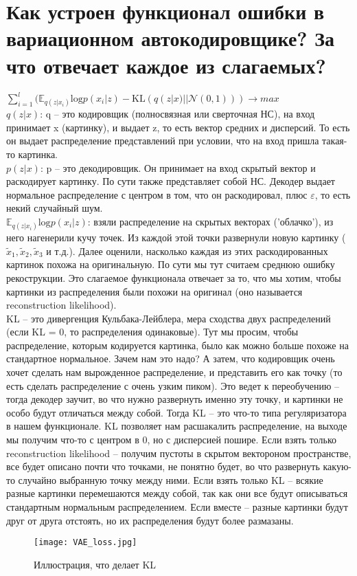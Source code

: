 \section{Как устроен функционал ошибки в вариационном автокодировщике? За что отвечает каждое из слагаемых?} %

$\sum\limits^{l}_{i = 1}(\mathbb{E}_{q(z|x_{i})}\text{log} p(x_{i} | z) - \text{KL}(q(z|x) || \mathcal{N}(0,1))) \rightarrow max$ \\ 

$q(z|x)$: q -- это кодировщик (полносвязная или сверточная НС), на вход принимает x (картинку), и выдает z, то есть вектор средних и дисперсий. То есть он выдает распределение представлений при условии, что на вход пришла такая-то картинка. \\ 

$p(z|x)$: p -- это декодировщик. Он принимает на вход скрытый вектор и раскодирует картинку. По сути также представляет собой НС. Декодер выдает нормальное распределение с центром в том, что он раскодировал, плюс $\varepsilon$, то есть некий случайный шум.\\ 

$\mathbb{E}_{q(z|x_{i})}\text{log} p(x_{i} | z)$: взяли распределение на скрытых векторах ('облачко'), из него нагенерили кучу точек. Из каждой этой точки развернули новую картинку ($\tilde x_{1}, \tilde x_{2}, \tilde x_{3}$ и т.д.). Далее оценили, насколько каждая из этих раскодированных картинок похожа на оригинальную. По сути мы тут считаем среднюю ошибку рекострукции. Это слагаемое функционала отвечает за то, что мы хотим, чтобы картинки из распределения были похожи на оригинал (оно называется reconstruction likelihood). \\ 

KL -- это дивергенция Кульбака-Лейблера, мера сходства двух распределений (если KL = 0, то распределения одинаковые). Тут мы просим, чтобы распределение, которым кодируется картинка, было как можно больше похоже на стандартное нормальное. Зачем нам это надо? А затем, что кодировщик очень хочет сделать нам вырожденное распределение, и представить его как точку (то есть сделать распределение с очень узким пиком). Это ведет к переобучению -- тогда декодер заучит, во что нужно развернуть именно эту точку, и картинки не особо будут отличаться между собой. Тогда KL -- это что-то типа регуляризатора в нашем функционале. KL позволяет нам расшакалить распределение, на выходе мы получим что-то с центром в 0, но с дисперсией пошире. Если взять только reconstruction likelihood -- получим пустоты в скрытом вектороном пространстве, все будет описано почти что точками, не понятно будет, во что развернуть какую-то случайно выбранную точку между ними. Если взять только KL -- всякие разные картинки перемешаются между собой, так как они все будут описываться стандартным нормальным распределением. Если вместе -- разные картинки будут друг от друга отстоять, но их распределения будут более размазаны. \\ 

\begin{figure}[H]
	\centering
	\texttt{[image: VAE\_loss.jpg]}
	\caption{Иллюстрация, что делает KL}
\end{figure}
